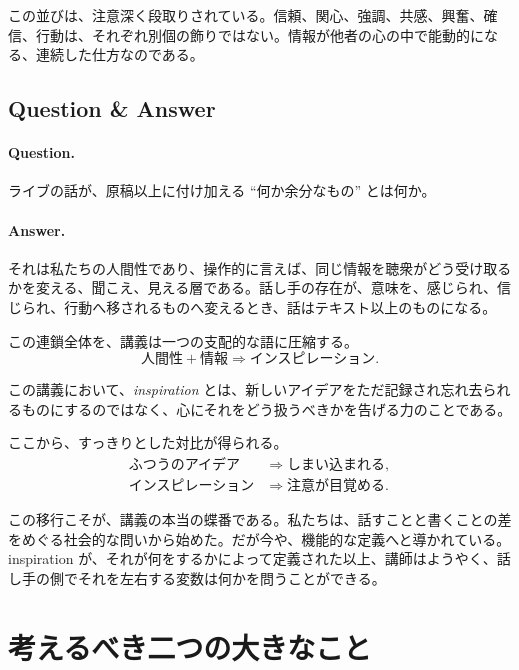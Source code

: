 この並びは、注意深く段取りされている。信頼、関心、強調、共感、興奮、確信、行動は、それぞれ別個の飾りではない。情報が他者の心の中で能動的になる、連続した仕方なのである。

\subsection{Question \& Answer}

\paragraph{Question.} ライブの話が、原稿以上に付け加える ``何か余分なもの'' とは何か。

\paragraph{Answer.} それは私たちの人間性であり、操作的に言えば、同じ情報を聴衆がどう受け取るかを変える、聞こえ、見える層である。話し手の存在が、意味を、感じられ、信じられ、行動へ移されるものへ変えるとき、話はテキスト以上のものになる。

この連鎖全体を、講義は一つの支配的な語に圧縮する。
\begin{equation}
\text{人間性} + \text{情報} \Longrightarrow \text{インスピレーション}.
\end{equation}

\begin{definition}
この講義において、\emph{inspiration} とは、新しいアイデアをただ記録され忘れ去られるものにするのではなく、心にそれをどう扱うべきかを告げる力のことである。
\end{definition}

ここから、すっきりとした対比が得られる。
\begin{align}
\text{ふつうのアイデア} &\Longrightarrow \text{しまい込まれる}, \\
\text{インスピレーション} &\Longrightarrow \text{注意が目覚める}.
\end{align}

この移行こそが、講義の本当の蝶番である。私たちは、話すことと書くことの差をめぐる社会的な問いから始めた。だが今や、機能的な定義へと導かれている。inspiration が、それが何をするかによって定義された以上、講師はようやく、話し手の側でそれを左右する変数は何かを問うことができる。

\section{考えるべき二つの大きなこと}

